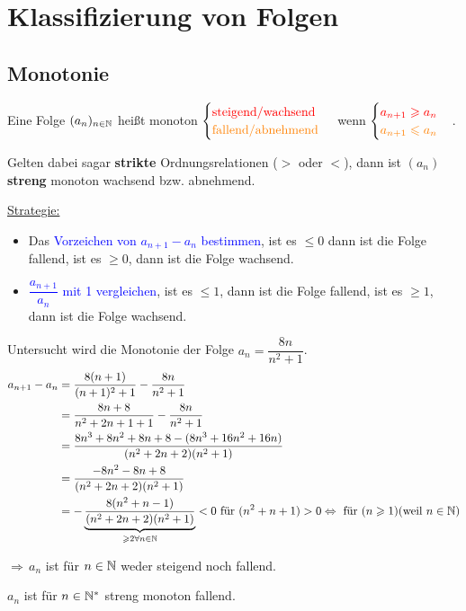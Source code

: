 \documentclass[main.tex]{subfiles}
\begin{document}
		\section{Klassifizierung von Folgen}


	\subsection{Monotonie}

\begin{Definition}
	Eine Folge $(a_n)_{n\in\N}$ heißt monoton
	$\begin{cases}
		\text{\textcolor{red}{steigend/wachsend}} \\
		\text{\textcolor{orange}{fallend/abnehmend}}
	\end{cases}$
	wenn
	$\begin{cases}
		\textcolor{red}{a_{n+1}\geq a_n} \\
		\textcolor{orange}{a_{n+1}\leq a_n}
	\end{cases}$.
	
	Gelten dabei sagar \textbf{strikte} Ordnungsrelationen ($>$ oder $<$), dann ist $(a_n)$ \textbf{streng} monoton wachsend bzw. abnehmend.
\end{Definition}

\underline{Strategie:}
\begin{itemize}
\item Das \textcolor{blue}{Vorzeichen von $a_{n+1}-a_n$ bestimmen}, ist es $\leq0$ dann ist die Folge fallend, ist es $\geq0$, dann ist die Folge wachsend.
\item \textcolor{blue}{$\dfrac{a_{n+1}}{a_n}$ mit 1 vergleichen}, ist es $\leq1$, dann ist die Folge fallend, ist es $\geq1$, dann ist die Folge wachsend.
\end{itemize}

\begin{Beispiel}
	Untersucht wird die Monotonie der Folge $a_n=\dfrac{8n}{n^2+1}$.
	\begin{align*}
		a_{n+1}-a_{n}&=\dfrac{8(n+1)}{(n+1)^2+1}-\dfrac{8n}{n^2+1}\\
		&=\dfrac{8n+8}{n^2+2n+1+1}-\dfrac{8n}{n^2+1}\\
		&=\dfrac{8n^3+8n^2+8n+8-(8n^3+16n^2+16n)}{(n^2+2n+2)(n^2+1)}\\
		&=\dfrac{-8n^2-8n+8}{(n^2+2n+2)(n^2+1)}\\
		&=-\underbrace{\dfrac{8(n^2+n-1)}{(n^2+2n+2)(n^2+1)}}_{\geq2\forall n\in \N}<0\text{ für } (n^2+n+1)>0\Leftrightarrow \text{ für } (n\geq 1) (\text{weil } n \in \N)
	\end{align*}

	$\Rightarrow \, a_n$ ist für $n\in\N$ weder steigend noch fallend.
	
	\indent $a_n$ ist für $n \in \N^*$ streng monoton fallend.
\end{Beispiel}
\end{document}
